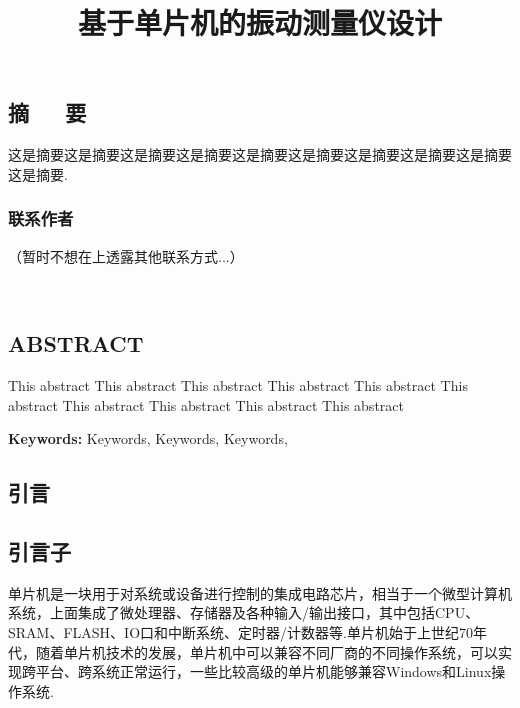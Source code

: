 \documentclass[12pt,a4paper,citestyle=gb7714-2015, bibstyle=gb7714-2015,bibtex]{HDUPaper}
\begin{document}
\thispagestyle{empty}
\title{基于单片机的振动测量仪设计}%
\maketitle
\begin{center}
\section*{\heiti\Large 摘~~~要}
\end{center}
\vspace{1em}

这是摘要这是摘要这是摘要这是摘要这是摘要这是摘要这是摘要这是摘要这是摘要这是摘要.
\subsubsection*{联系作者}
（暂时不想在\faGithub 上透露其他联系方式...）

  \faEnvelope\ 

\newpage\thispagestyle{empty}
\begin{center}
\section*{\heiti\Large ABSTRACT}
\end{center}

This abstract This abstract This abstract This abstract This abstract This abstract This abstract This abstract This abstract This abstract 

\textbf{Keywords: }Keywords, Keywords, Keywords, 
\newpage\thispagestyle{empty}
\begin{center}
  \tableofcontents
\end{center}
\newpage
\myemptypage
\setcounter{page}{1}
\begin{center}
\section{引言}
\end{center}

\subsection{引言子}
单片机是一块用于对系统或设备进行控制的集成电路芯片，相当于一个微型计算机系统，上面集成了微处理器、存储器及各种输入/输出接口，其中包括CPU、SRAM、FLASH、IO口和中断系统、定时器/计数器等.单片机始于上世纪70年代，随着单片机技术的发展，单片机中可以兼容不同厂商的不同操作系统，可以实现跨平台、跨系统正常运行，一些比较高级的单片机能够兼容Windows和Linux操作系统\cite{cn5}.
\end{document}
